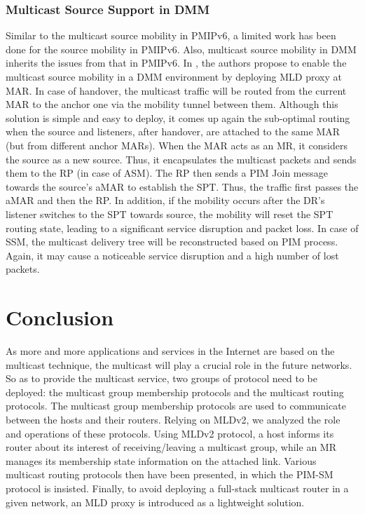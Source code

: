 \subsubsection{Multicast Source Support in DMM}
Similar to the multicast source mobility in PMIPv6, a limited work has been done for the source mobility in PMIPv6. Also, multicast source mobility in DMM inherits the issues from that in PMIPv6. In \cite{d4.2,multicast_DMM_sergio}, the authors propose to enable the multicast source mobility in a DMM environment by deploying MLD proxy at MAR. In case of handover, the multicast traffic will be routed from the current MAR to the anchor one via the mobility tunnel between them. Although this solution is simple and easy to deploy, it comes up again the sub-optimal routing when the source and listeners, after handover, are attached to the same MAR (but from different anchor MARs). When the MAR acts as an MR, it considers the source as a new source. Thus, it encapsulates the multicast packets and sends them to the RP (in case of ASM). The RP then sends a PIM Join message towards the source's aMAR to establish the SPT. Thus, the traffic first passes the aMAR and then the RP. In addition, if the mobility occurs after the DR's listener switches to the SPT towards source, the mobility will reset the SPT routing state, leading to a significant service disruption and packet loss. In case of SSM, the multicast delivery tree will be reconstructed based on PIM process. Again, it may cause a noticeable service disruption and a high number of lost packets. 
\section{Conclusion}

As more and more applications and services in the Internet are based on the multicast technique, the multicast will play a crucial role in the future networks. So as to provide the multicast service, two groups of protocol need to be deployed: the multicast group membership protocols and the multicast routing protocols. The multicast group membership protocols are used to communicate between the hosts and their routers. Relying on MLDv2, we analyzed the role and operations of these protocols. Using MLDv2 protocol, a host informs its router about its interest of receiving/leaving a multicast group, while an MR manages its membership state information on the attached link. Various multicast routing protocols then have been presented, in which the PIM-SM protocol is insisted. Finally, to avoid deploying a full-stack multicast router in a given network, an MLD proxy is introduced as a lightweight solution. 


